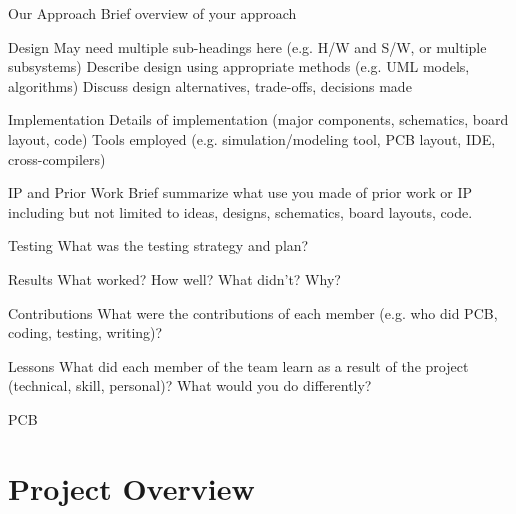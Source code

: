 \documentclass{beamer}
\begin{document}
\begin{frame}{Our Approach}
Brief overview of your approach
\end{frame}

\begin{frame}{Design}
May need multiple sub-headings here (e.g.  H/W and S/W, or multiple
subsystems) Describe design using appropriate methods (e.g.  UML
models, algorithms) Discuss design alternatives, trade-offs, decisions
made
\end{frame}

\begin{frame}{Implementation}
Details of implementation (major components, schematics, board layout,
code)	  
Tools employed (e.g.  simulation/modeling tool, PCB layout, IDE,
cross-compilers)
\end{frame}

\begin{frame}{IP and Prior Work}
Brief summarize what use you made of prior work or IP including but
not limited to ideas, designs, schematics, board layouts, code.
\end{frame}

\begin{frame}{Testing}
What was the testing strategy and plan?  
\end{frame}

\begin{frame}{Results}
What worked? How well? What didn't? Why?
  
\end{frame}

\begin{frame}{Contributions}
What were the contributions of each member (e.g.  who did PCB, coding,
testing, writing)?
  
\end{frame}
\begin{frame}{Lessons}
What did each member of the team learn as a result of the project
(technical, skill, personal)?  What would you do differently?
\end{frame}

\begin{frame}{PCB}
\end{frame}


\section{Project Overview} 
\end{document}
